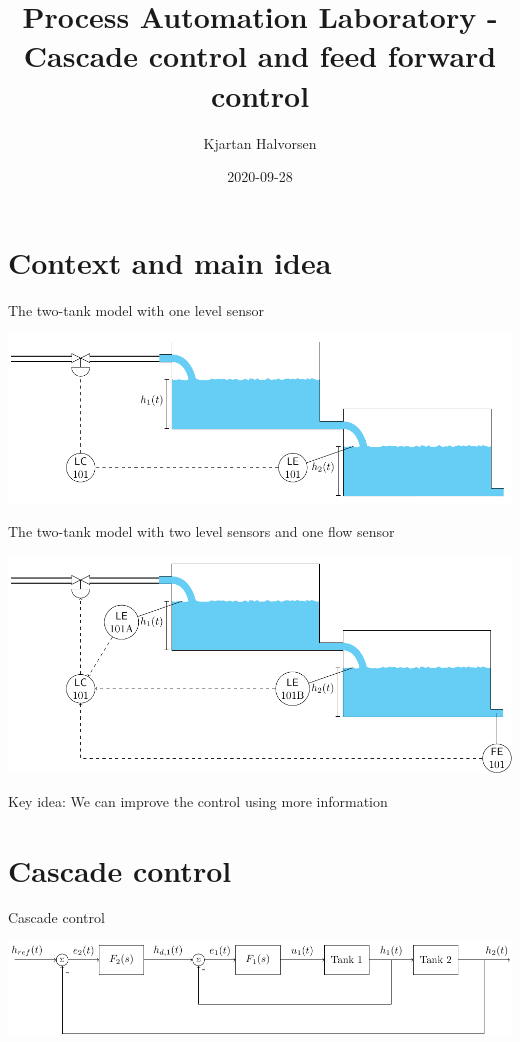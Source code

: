 \documentclass[presentation,aspectratio=169, usenames, dvipsnames]{beamer}
\author{Kjartan Halvorsen}
\date{2020-09-28}
\title{Process Automation Laboratory - Cascade control and feed forward control}
\begin{document}
\maketitle

\section{Context and main idea}
\label{sec:orgf84f686}
\begin{frame}[label={sec:org46648dd}]{The two-tank model with one level sensor}
\begin{center}
\includegraphics[width=\linewidth]{../../figures/two-tanks-shutoff-valve}
\end{center}
\end{frame}

\begin{frame}[label={sec:orgded96b9}]{The two-tank model with two level sensors and one flow sensor}
\begin{center}
\includegraphics[width=\linewidth]{../../figures/two-tanks-2LE-FE}
\end{center}

\alert{Key idea: We can improve the control using more information}
\end{frame}

\section{Cascade control}
\label{sec:orgf103e54}
\begin{frame}[label={sec:org6010b11}]{Cascade control}
\begin{center}
\includegraphics[width=\linewidth]{../../figures/block-diagram-cascade-control.pdf}
\end{center}
\end{frame}
\end{document}
